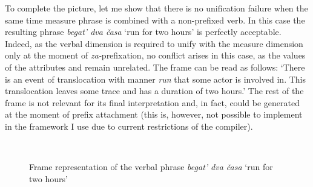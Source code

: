 To complete the picture, let me show that there is no unification failure when the same time measure phrase is combined with a non-prefixed verb. In this case the resulting phrase \textit{begat' dva \v{c}asa} `run for two hours' is perfectly acceptable. Indeed, as the verbal dimension is required to unify with the measure dimension only at the moment of \textit{za-}prefixation, no conflict arises in this case, as the values of the attributes \MDIM and \VERBDIM remain unrelated. The frame can be read as follows: `There is an event of translocation with manner \textit{run} that some actor is involved in. This translocation leaves some trace and has a duration of two hours.' The rest of the frame is not relevant for its final interpretation and, in fact, could be generated at the moment of prefix attachment (this is, however, not possible to implement in the framework I use due to current restrictions of the compiler).

\begin{figure}
\centering
{}\\
\caption{Frame representation of the verbal phrase \textit{begat' dva \v{c}asa} `run for two hours' \label{frame:begat:2hours}}
\end{figure}

